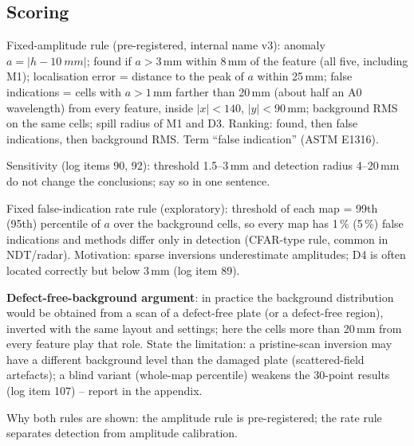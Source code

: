 \subsection{Scoring}\label{sec:scoring}
\begin{notes}
\item Fixed-amplitude rule (pre-registered, internal name v3): anomaly $a=|h-\SI{10}{mm}|$; found if $a>3$\,mm within 8\,mm of the feature (all five, including M1); localisation error = distance to the peak of $a$ within 25\,mm; false indications = cells with $a>1$\,mm farther than 20\,mm (about half an A0 wavelength) from every feature, inside $|x|<140$, $|y|<90$\,mm; background RMS on the same cells; spill radius of M1 and D3. Ranking: found, then false indications, then background RMS. Term ``false indication'' (ASTM E1316).
\item Sensitivity (log items 90, 92): threshold 1.5--3\,mm and detection radius 4--20\,mm do not change the conclusions; say so in one sentence.
\item Fixed false-indication rate rule (exploratory): threshold of each map = 99th (95th) percentile of $a$ over the background cells, so every map has 1\,\% (5\,\%) false indications and methods differ only in detection (CFAR-type rule, common in NDT/radar). Motivation: sparse inversions underestimate amplitudes; D4 is often located correctly but below 3\,mm (log item 89).
\item \textbf{Defect-free-background argument}: in practice the background distribution would be obtained from a scan of a defect-free plate (or a defect-free region), inverted with the same layout and settings; here the cells more than 20\,mm from every feature play that role. State the limitation: a pristine-scan inversion may have a different background level than the damaged plate (scattered-field artefacts); a blind variant (whole-map percentile) weakens the 30-point results (log item 107) -- report in the appendix.
\item Why both rules are shown: the amplitude rule is pre-registered; the rate rule separates detection from amplitude calibration.
\end{notes}
